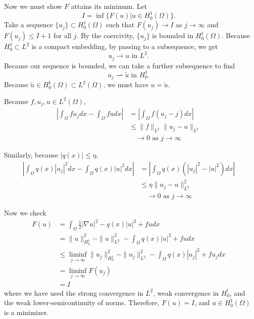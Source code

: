 \documentclass[a4paper]{article}
\begin{document}
\begin{enumerate}
    Now we must show $F$ attains its minimum. Let
    \[ I = \inf \{ F(u) | u\in H^1_0(\Omega) \} .\]
    Take a sequence $\{u_j\} \subset H_0^1(\Omega)$ such that $F(u_j) \to I$ as $j \to \infty$ and $F(u_j) \leq I+1$ for all $j$. By the coercivity,
    $\{ u_j \}$ is bounded in $H_0^1(\Omega)$. Because $H^1_0 \subset L^2$ is a compact embedding, by passing to a subsequence, we get
    \[ u_j \to u \text{ in } L^2 .\]
    Because our sequence is bounded, we can take a further subsequence to find
    \[ u_j \rightharpoonup \tilde{u} \text{ in } H^1_0 .\]
    Because $\tilde{u} \in H^1_0(\Omega) \subset L^2(\Omega)$, we must have $u = \tilde{u}$.

    Because $f, u_j, u \in L^2(\Omega)$,
    \begin{align*}
      \left| \int_{\Omega}^{} f u_j dx - \int_{\Omega}^{} fu dx \right| &= \left| \int_{\Omega}^{} f (u_j - j)dx \right| \\
      &\leq \|f\|_{L^2} \|u_j - u\|_{L^2} \\
      &\quad \to 0 \text{ as } j \to \infty
    \end{align*}

    Similarly, because $|q(x)| \leq \eta$,
    \begin{align*}
      \left| \int_{\Omega}^{} q(x) |u_j|^2 dx - \int_{\Omega}^{} q(x) |u|^2 dx \right| &= \left| \int_{\Omega}^{} q(x) \left( |u_j|^2 - |u|^2 \right)
      dx \right| \\
      &\leq \eta \|u_j - u\|_{L^2}^2 \\
      &\quad \to 0 \text{ as } j \to \infty
    \end{align*}

    Now we check
    \begin{align*}
      F(u) &= \int_{\Omega}^{} \frac{1}{2} |\nabla u|^2 - q(x) |u|^2 + fu dx \\
      &= \|u\|_{H_0^1}^2 - \|u\|_{L^2}^2 - \int_{\Omega}^{} q(x) |u|^2 + fu dx \\
      &\leq \liminf_{j \to \infty} \|u_j\|_{H^1_0}^2 - \|u_j\|_{L^2}^2 - \int_{\Omega}^{} q(x) |u_j|^2 + fu_j dx \\
      &= \liminf_{j \to \infty} F(u_j) \\
      &= I
    \end{align*}
    where we have used the strong convergence in $L^2$, weak convergence in $H^!_0$, and the weak lower-semicontinuity of norms.
    Therefore, $F(u) = I$, and $u \in H^1_0(\Omega)$ is a minimizer.


\end{enumerate}
\end{document}
